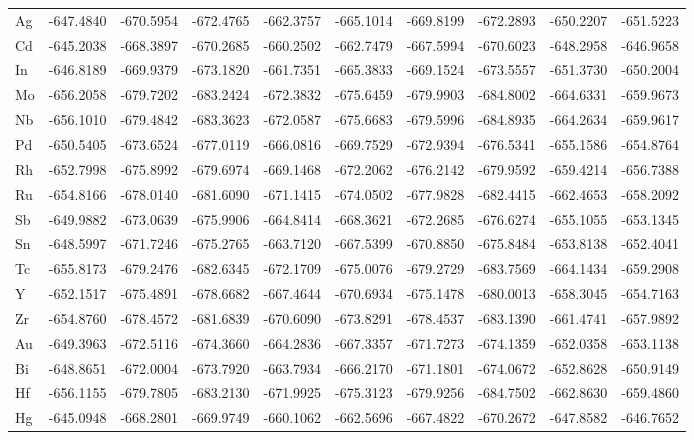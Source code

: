 \begin{table}[htbp]
{\begin{tabular}{l *{9}{c}}
      Ag & -647.4840 & -670.5954 & -672.4765 & -662.3757 & -665.1014 & -669.8199 & -672.2893 & -650.2207 & -651.5223 \\
      Cd & -645.2038 & -668.3897 & -670.2685 & -660.2502 & -662.7479 & -667.5994 & -670.6023 & -648.2958 & -646.9658 \\
      In & -646.8189 & -669.9379 & -673.1820 & -661.7351 & -665.3833 & -669.1524 & -673.5557 & -651.3730 & -650.2004 \\
      Mo & -656.2058 & -679.7202 & -683.2424 & -672.3832 & -675.6459 & -679.9903 & -684.8002 & -664.6331 & -659.9673 \\
      Nb & -656.1010 & -679.4842 & -683.3623 & -672.0587 & -675.6683 & -679.5996 & -684.8935 & -664.2634 & -659.9617 \\
      Pd & -650.5405 & -673.6524 & -677.0119 & -666.0816 & -669.7529 & -672.9394 & -676.5341 & -655.1586 & -654.8764 \\
      Rh & -652.7998 & -675.8992 & -679.6974 & -669.1468 & -672.2062 & -676.2142 & -679.9592 & -659.4214 & -656.7388 \\
      Ru & -654.8166 & -678.0140 & -681.6090 & -671.1415 & -674.0502 & -677.9828 & -682.4415 & -662.4653 & -658.2092 \\
      Sb & -649.9882 & -673.0639 & -675.9906 & -664.8414 & -668.3621 & -672.2685 & -676.6274 & -655.1055 & -653.1345 \\
      Sn & -648.5997 & -671.7246 & -675.2765 & -663.7120 & -667.5399 & -670.8850 & -675.8484 & -653.8138 & -652.4041 \\
      Tc & -655.8173 & -679.2476 & -682.6345 & -672.1709 & -675.0076 & -679.2729 & -683.7569 & -664.1434 & -659.2908 \\
      Y  & -652.1517 & -675.4891 & -678.6682 & -667.4644 & -670.6934 & -675.1478 & -680.0013 & -658.3045 & -654.7163 \\
      Zr & -654.8760 & -678.4572 & -681.6839 & -670.6090 & -673.8291 & -678.4537 & -683.1390 & -661.4741 & -657.9892 \\
      Au & -649.3963 & -672.5116 & -674.3660 & -664.2836 & -667.3357 & -671.7273 & -674.1359 & -652.0358 & -653.1138 \\
      Bi & -648.8651 & -672.0004 & -673.7920 & -663.7934 & -666.2170 & -671.1801 & -674.0672 & -652.8628 & -650.9149 \\
      Hf & -656.1155 & -679.7805 & -683.2130 & -671.9925 & -675.3123 & -679.9256 & -684.7502 & -662.8630 & -659.4860 \\
      Hg & -645.0948 & -668.2801 & -669.9749 & -660.1062 & -662.5696 & -667.4822 & -670.2672 & -647.8582 & -646.7652 \\

\end{tabular}}
\end{table}
